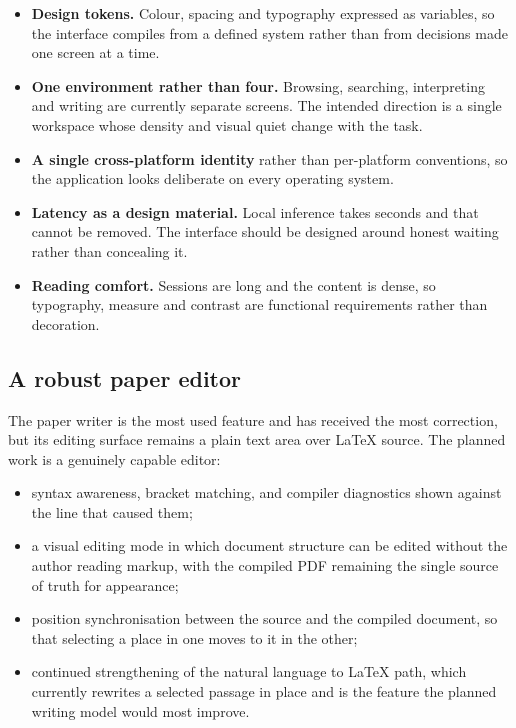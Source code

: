 \documentclass[11pt,a4paper]{article}
\begin{document}
\begin{itemize}[leftmargin=*]
  \item \textbf{Design tokens.} Colour, spacing and typography expressed as
        variables, so the interface compiles from a defined system rather than
        from decisions made one screen at a time.
  \item \textbf{One environment rather than four.} Browsing, searching,
        interpreting and writing are currently separate screens. The intended
        direction is a single workspace whose density and visual quiet change
        with the task.
  \item \textbf{A single cross-platform identity} rather than per-platform
        conventions, so the application looks deliberate on every operating
        system.
  \item \textbf{Latency as a design material.} Local inference takes seconds and
        that cannot be removed. The interface should be designed around honest
        waiting rather than concealing it.
  \item \textbf{Reading comfort.} Sessions are long and the content is dense, so
        typography, measure and contrast are functional requirements rather than
        decoration.
\end{itemize}

\subsection{A robust paper editor}

The paper writer is the most used feature and has received the most correction,
but its editing surface remains a plain text area over LaTeX source. The planned
work is a genuinely capable editor:

\begin{itemize}[leftmargin=*]
  \item syntax awareness, bracket matching, and compiler diagnostics shown
        against the line that caused them;
  \item a visual editing mode in which document structure can be edited without
        the author reading markup, with the compiled PDF remaining the single
        source of truth for appearance;
  \item position synchronisation between the source and the compiled document,
        so that selecting a place in one moves to it in the other;
  \item continued strengthening of the natural language to LaTeX path, which
        currently rewrites a selected passage in place and is the feature the
        planned writing model would most improve.
\end{itemize}
\end{document}
